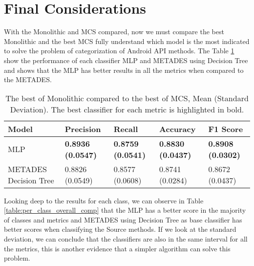 \section{Final Considerations}\label{result_ending}

With the Monolithic and MCS compared, now we must compare the best Monolithic and the best MCS fully understand which model is the most indicated to solve the problem of categorization of Android API methods. The Table \ref{table:overall_comp} show the performance of each classifier MLP and METADES using Decision Tree and shows that the MLP has better results in all the metrics when compared to the METADES.

\begin{table}[h!]
    \centering
    \renewcommand{\arraystretch}{1.8}
    \begin{tabular}{ p{3cm}p{2.8cm}p{2.8cm}p{2.8cm}p{2.8cm} }
        \toprule
        Model & Precision & Recall & Accuracy & F1 Score \\
        \midrule
        MLP & \textbf{0.8936 (0.0547)} & \textbf{0.8759 (0.0541)} & \textbf{0.8830 (0.0437)} & \textbf{0.8908 (0.0302)} \\
        METADES \newline Decision Tree & 0.8826 (0.0549) & 0.8577 (0.0608) & 0.8741 (0.0284) & 0.8672 (0.0437) \\
        \bottomrule
    \end{tabular}
    \caption{%
        The best of Monolithic compared to the best of MCS, Mean (Standard Deviation). The best classifier for each metric is highlighted in bold.
    }\label{table:overall_comp}
\end{table}

Looking deep to the results for each class, we can observe in Table \ref{table:per_class_overall_comp} that the MLP has a better score in the majority of classes and metrics and METADES using Decision Tree as base classifier has better scores when classifying the Source methods. If we look at the standard deviation, we can conclude that the classifiers are also in the same interval for all the metrics, this is another evidence that a simpler algorithm can solve this problem.

